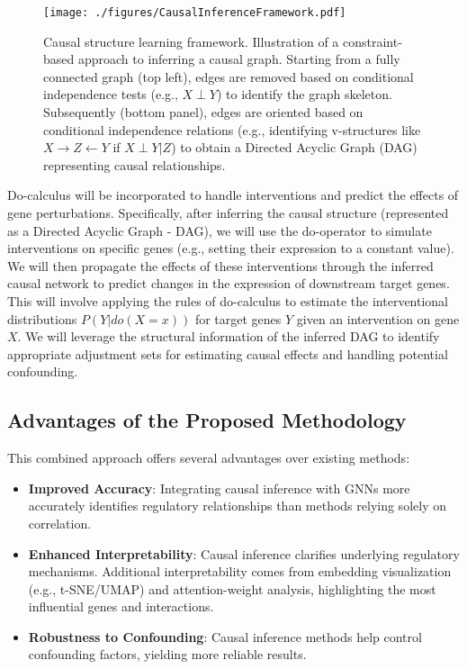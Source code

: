\begin{figure}[htbp]
    \centering
    \texttt{[image: ./figures/CausalInferenceFramework.pdf]}
    \caption{
        Causal structure learning framework. Illustration of a constraint-based approach to inferring a causal graph. Starting from a fully connected graph (top left), edges are removed based on conditional independence tests (e.g., $X \perp Y$) to identify the graph skeleton. Subsequently (bottom panel), edges are oriented based on conditional independence relations (e.g., identifying v-structures like $X \rightarrow Z \leftarrow Y$ if $X \perp Y | Z$) to obtain a Directed Acyclic Graph (DAG) representing causal relationships.
    }
    \label{fig:causalinferenceframework}
\end{figure}

Do-calculus \cite{pearl2009causal,zevcevic2021relating} will be incorporated to handle interventions and predict the effects of gene perturbations. Specifically, after inferring the causal structure (represented as a Directed Acyclic Graph - DAG), we will use the do-operator to simulate interventions on specific genes (e.g., setting their expression to a constant value). We will then propagate the effects of these interventions through the inferred causal network to predict changes in the expression of downstream target genes. This will involve applying the rules of do-calculus to estimate the interventional distributions $P(Y|do(X=x))$ for target genes $Y$ given an intervention on gene $X$. We will leverage the structural information of the inferred DAG to identify appropriate adjustment sets for estimating causal effects and handling potential confounding.

\clearpage
\subsection{Advantages of the Proposed Methodology}
This combined approach offers several advantages over existing methods:
\begin{itemize}
    \item \textbf{Improved Accuracy}: Integrating causal inference with GNNs more accurately identifies regulatory relationships than methods relying solely on correlation.

    \item \textbf{Enhanced Interpretability}: Causal inference clarifies underlying regulatory mechanisms. Additional interpretability comes from embedding visualization (e.g., t-SNE/UMAP) and attention-weight analysis, highlighting the most influential genes and interactions.

    \item \textbf{Robustness to Confounding}: Causal inference methods help control confounding factors, yielding more reliable results.
\end{itemize}

